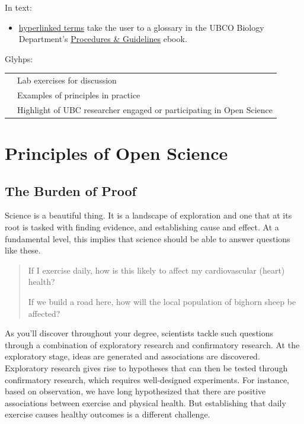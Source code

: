 \documentclass[
]{book}
\providecommand{\tightlist}{%
  \setlength{\itemsep}{0pt}\setlength{\parskip}{0pt}}
\begin{document}
In text:

\begin{itemize}
\tightlist
\item
  \href{}{hyperlinked terms} take the user to a glossary in the UBCO Biology Department's \href{}{Procedures \& Guidelines} ebook.
\end{itemize}

Glyhps:

\begin{longtable}[]{@{}ll@{}}
\toprule
\endhead
& Lab exercises for discussion \\
& Examples of principles in practice \\
& Highlight of UBC researcher engaged or participating in Open Science \\
\bottomrule
\end{longtable}

\hypertarget{principles-of-open-science}{%
\chapter{Principles of Open Science}\label{principles-of-open-science}}

\hypertarget{the-burden-of-proof}{%
\section{The Burden of Proof}\label{the-burden-of-proof}}

Science is a beautiful thing. It is a landscape of exploration and one that at its root is tasked with finding evidence, and establishing cause and effect. At a fundamental level, this implies that science should be able to answer questions like these.

\begin{quote}
If I exercise daily, how is this likely to affect my cardiovascular (heart) health?

If we build a road here, how will the local population of bighorn sheep be affected?
\end{quote}

As you'll discover throughout your degree, scientists tackle such questions through a combination of exploratory research and confirmatory research. At the exploratory stage, ideas are generated and associations are discovered. Exploratory research gives rise to hypotheses that can then be tested through confirmatory research, which requires well-designed experiments. For instance, based on observation, we have long hypothesized that there are positive associations between exercise and physical health. But establishing that daily exercise causes healthy outcomes is a different challenge.
\end{document}
